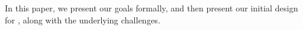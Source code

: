 \documentclass{sig-alternate}
\begin{document}
In this paper, we present our goals formally, and then present our initial design for \SeeDB, along with the underlying challenges.









\end{document}
